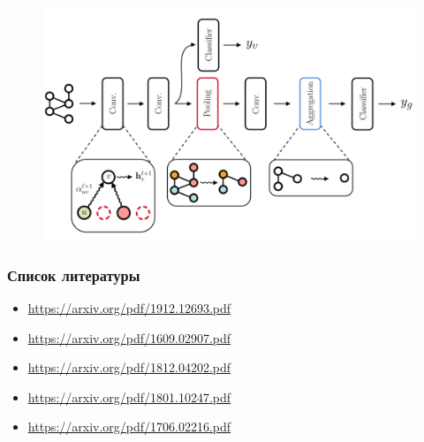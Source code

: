 \documentclass{beamer}
\begin{document}
\begin{frame}
	\begin{figure}
		\includegraphics[width=\columnwidth]{network.png}
	\end{figure}
\end{frame}

\begin{frame}
\frametitle{Список литературы}
\begin{itemize}
	\item \url{https://arxiv.org/pdf/1912.12693.pdf}
	\item \url{https://arxiv.org/pdf/1609.02907.pdf}
	\item \url{https://arxiv.org/pdf/1812.04202.pdf}
	\item \url{https://arxiv.org/pdf/1801.10247.pdf}
	\item \url{https://arxiv.org/pdf/1706.02216.pdf}
\end{itemize}
\end{frame}










\end{document}
